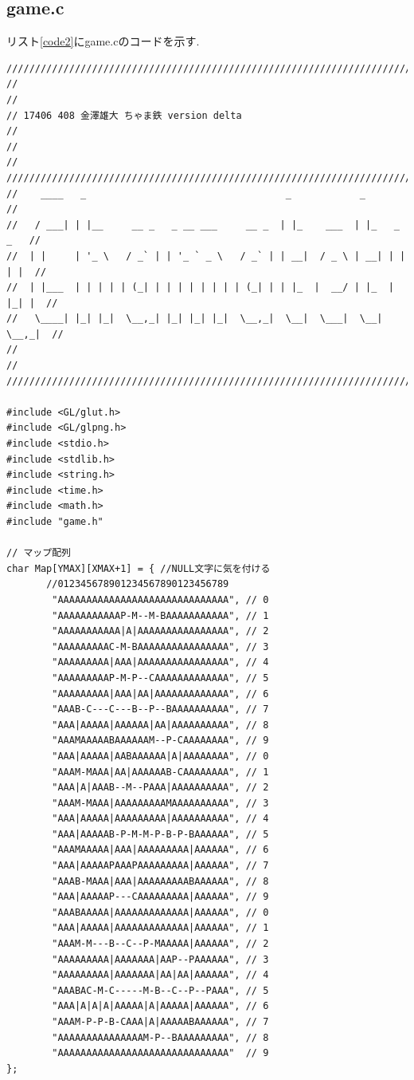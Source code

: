 \documentclass[a4j]{jarticle}
\begin{document}
    \subsection{game.c}
    リスト\ref{code2}にgame.cのコードを示す.
    \begin{lstlisting}[basicstyle=\ttfamily\footnotesize, frame=single,label=code2,caption=game.c]
//////////////////////////////////////////////////////////////////////////////
//                                                                          //
// 17406 408 金澤雄大 ちゃま鉄 version delta                                 //
//                                                                          //
//////////////////////////////////////////////////////////////////////////////
//    ____   _                                   _            _             //
//   / ___| | |__     __ _   _ __ ___     __ _  | |_    ___  | |_   _   _   //
//  | |     | '_ \   / _` | | '_ ` _ \   / _` | | __|  / _ \ | __| | | | |  //
//  | |___  | | | | | (_| | | | | | | | | (_| | | |_  |  __/ | |_  | |_| |  //
//   \____| |_| |_|  \__,_| |_| |_| |_|  \__,_|  \__|  \___|  \__|  \__,_|  //
//                                                                          //
//////////////////////////////////////////////////////////////////////////////                                                                       

#include <GL/glut.h>
#include <GL/glpng.h>
#include <stdio.h>
#include <stdlib.h>
#include <string.h>
#include <time.h>
#include <math.h>
#include "game.h"

// マップ配列
char Map[YMAX][XMAX+1] = { //NULL文字に気を付ける
       //012345678901234567890123456789      
        "AAAAAAAAAAAAAAAAAAAAAAAAAAAAAA", // 0
        "AAAAAAAAAAAP-M--M-BAAAAAAAAAAA", // 1
        "AAAAAAAAAAA|A|AAAAAAAAAAAAAAAA", // 2
        "AAAAAAAAAC-M-BAAAAAAAAAAAAAAAA", // 3
        "AAAAAAAAA|AAA|AAAAAAAAAAAAAAAA", // 4
        "AAAAAAAAAP-M-P--CAAAAAAAAAAAAA", // 5
        "AAAAAAAAA|AAA|AA|AAAAAAAAAAAAA", // 6
        "AAAB-C---C---B--P--BAAAAAAAAAA", // 7
        "AAA|AAAAA|AAAAAA|AA|AAAAAAAAAA", // 8
        "AAAMAAAAABAAAAAAM--P-CAAAAAAAA", // 9
        "AAA|AAAAA|AABAAAAAA|A|AAAAAAAA", // 0
        "AAAM-MAAA|AA|AAAAAAB-CAAAAAAAA", // 1
        "AAA|A|AAAB--M--PAAA|AAAAAAAAAA", // 2
        "AAAM-MAAA|AAAAAAAAAMAAAAAAAAAA", // 3
        "AAA|AAAAA|AAAAAAAAA|AAAAAAAAAA", // 4
        "AAA|AAAAAB-P-M-M-P-B-P-BAAAAAA", // 5
        "AAAMAAAAA|AAA|AAAAAAAAA|AAAAAA", // 6
        "AAA|AAAAAPAAAPAAAAAAAAA|AAAAAA", // 7
        "AAAB-MAAA|AAA|AAAAAAAAABAAAAAA", // 8
        "AAA|AAAAAP---CAAAAAAAAA|AAAAAA", // 9
        "AAABAAAAA|AAAAAAAAAAAAA|AAAAAA", // 0
        "AAA|AAAAA|AAAAAAAAAAAAA|AAAAAA", // 1
        "AAAM-M---B--C--P-MAAAAA|AAAAAA", // 2
        "AAAAAAAAA|AAAAAAA|AAP--PAAAAAA", // 3
        "AAAAAAAAA|AAAAAAA|AA|AA|AAAAAA", // 4
        "AAABAC-M-C-----M-B--C--P--PAAA", // 5
        "AAA|A|A|A|AAAAA|A|AAAAA|AAAAAA", // 6
        "AAAM-P-P-B-CAAA|A|AAAAABAAAAAA", // 7
        "AAAAAAAAAAAAAAAM-P--BAAAAAAAAA", // 8
        "AAAAAAAAAAAAAAAAAAAAAAAAAAAAAA"  // 9
};


\end{lstlisting}
\end{document}
